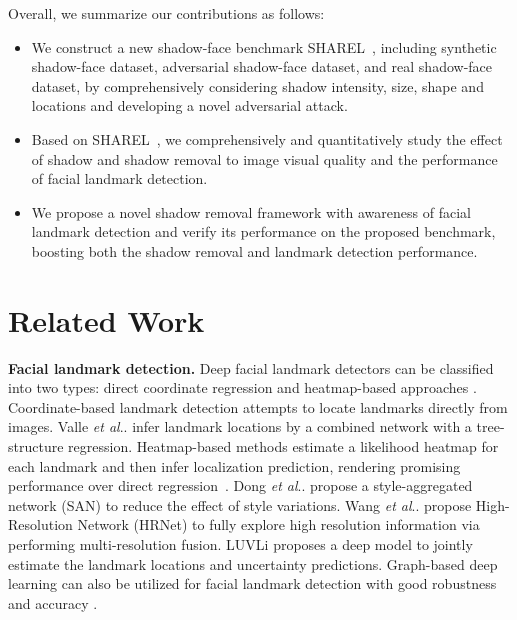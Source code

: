 \documentclass[10pt,twocolumn,letterpaper]{article}
\makeatletter
\def\ourmethod{{SHAREL}~}
\DeclareRobustCommand\onedot{\futurelet\@let@token\@onedot}
\def\@onedot{\ifx\@let@token.\else.\null\fi\xspace}
\def\etal{\emph{et al}\onedot}
\renewcommand{\paragraph}[1]{\vspace{1.25mm}\noindent\textbf{#1}}
\makeatother
\begin{document}
Overall, we summarize our contributions as follows:
\begin{itemize}[noitemsep, nolistsep,leftmargin=*] 
%
\item We construct a new shadow-face benchmark \ourmethod, including synthetic shadow-face dataset, adversarial shadow-face dataset, and real shadow-face dataset, by comprehensively considering shadow intensity, size, shape and locations and developing a novel adversarial attack.
%
\item Based on \ourmethod, we comprehensively and quantitatively study the effect of shadow and shadow removal to image visual quality and the performance of facial landmark detection.
%
\item We propose a novel shadow removal framework with awareness of facial landmark detection and verify its performance on the proposed benchmark, boosting both the shadow removal and landmark detection performance.
\end{itemize}

\section{Related Work}

\paragraph{Facial landmark detection.}
Deep facial landmark detectors can be classified into two types: direct coordinate regression \cite{toshev2014deeppose,valle2018deeply,li2020structured} and heatmap-based approaches \cite{dong2018style,wang2020deep,zou2019learning}. Coordinate-based landmark detection attempts to locate landmarks directly from images. 
Valle \etal \cite{valle2018deeply} infer landmark locations by a combined network with a tree-structure regression. Heatmap-based methods estimate a likelihood heatmap for each landmark and then infer localization prediction, rendering promising performance over direct regression~\cite{belagiannis2017recurrent}. Dong \etal \cite{dong2018style} propose a style-aggregated network (SAN) to reduce the effect of style variations. Wang \etal \cite{wang2020deep} propose High-Resolution Network (HRNet) to fully explore high resolution information via performing multi-resolution fusion. LUVLi \cite{kumar2020luvli} proposes a deep model to jointly estimate the landmark locations and uncertainty predictions. Graph-based deep learning can also be utilized for facial landmark detection with good robustness and accuracy \cite{li2020structured}.
%
\end{document}
